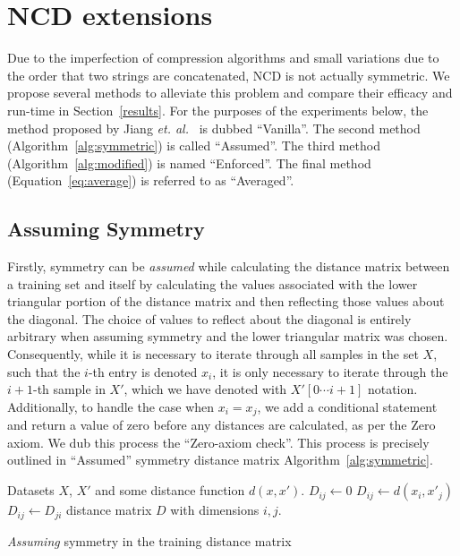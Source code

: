 \documentclass[preprint,12pt]{elsarticle}
\begin{document}
\section{NCD extensions}
\label{extensions}

Due to the imperfection of compression algorithms and small variations due to the order that two strings are concatenated, NCD is not actually symmetric.
We propose several methods to alleviate this problem and compare their efficacy and run-time in Section~\ref{results}.
For the purposes of the experiments below, the method proposed by Jiang \textit{et. al.}~\cite{jiang2022less} is dubbed ``Vanilla''.
The second method (Algorithm~\ref{alg:symmetric}) is called ``Assumed''.
The third method (Algorithm~\ref{alg:modified}) is named ``Enforced''.
The final method (Equation~\ref{eq:average}) is referred to as ``Averaged''.

\subsection{Assuming Symmetry}
Firstly, symmetry can be \textit{assumed} while calculating the distance matrix between a training set and itself by calculating the values associated with the lower triangular portion of the distance matrix and then reflecting those values about the diagonal.
The choice of values to reflect about the diagonal is entirely arbitrary when assuming symmetry and the lower triangular matrix was chosen.
Consequently, while it is necessary to iterate through all samples in the set $X$, such that the $i$-th entry is denoted $x_i$, it is only necessary to iterate through the $i +1$-th sample in $X'$, which we have denoted with $X'[0 \cdots i + 1 ]$ notation.
Additionally, to handle the case when $x_i = x_j$, we add a conditional statement and return a value of zero before any distances are calculated, as per the Zero axiom.
We dub this process the ``Zero-axiom check''.
This process is precisely outlined in ``Assumed'' symmetry distance matrix Algorithm~\ref{alg:symmetric}.

\begin{algorithm}
    \begin{algorithmic}
        \Require Datasets $X$, $X'$ and some distance function $d(x, x')$.
             
                 
                    \State $D_{ij} \gets 0$
                \Else
                    \State $D_{ij} \gets d(x_{i},x'_{j})$
                \EndIf
                \State $D_{ij} \gets D_{ji}$ 
            \EndFor
        \EndFor
        \State \Return distance matrix $D$ with dimensions $i,j$.
    \end{algorithmic}
    \caption{\textit{Assuming} symmetry in the training distance matrix}
    \label{alg:symmetric}
\end{algorithm}
\end{document}

